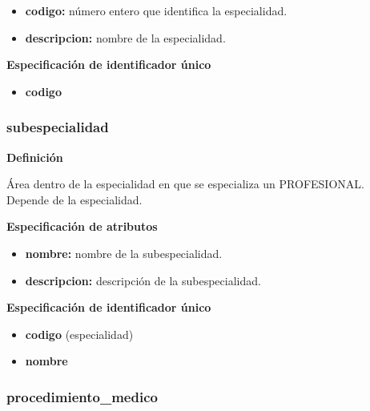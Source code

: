 \documentclass[a4paper,11pt]{article}
\begin{document}
\begin{itemize}

     \item \textbf{codigo:} número entero que identifica la especialidad.

     \item \textbf{descripcion:} nombre de la especialidad.

\end{itemize}

\textbf{Especificación de identificador único}

\begin{itemize}

     \item \textbf{codigo}

\end{itemize}

\subsubsection{\textbf{subespecialidad}}

\textbf{Definición}

Área dentro de la especialidad en que se especializa un PROFESIONAL. Depende de 
la especialidad.

\textbf{Especificación de atributos}

\begin{itemize}

     \item \textbf{nombre:} nombre de la subespecialidad.

     \item \textbf{descripcion:} descripción de la subespecialidad.

\end{itemize}

\textbf{Especificación de identificador único}

\begin{itemize}

     \item \textbf{codigo} (especialidad)

     \item \textbf{nombre}

\end{itemize}

\subsubsection{\textbf{procedimiento\_medico}}
\end{document}
